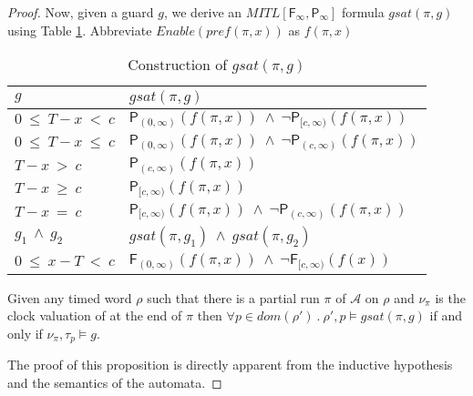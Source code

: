 \documentclass{llncs}
\newcommand{\fut}{\textsf{F}}
\newcommand{\past}{\textsf{P}}
\newcommand{\autm}{\mathcal A}
\newcommand{\mitlfpinf}{\mbox{$\mathit{MITL[\fut_\infty,\past_\infty]}$}}
\begin{document}
\begin{proof}
\medskip
Now, given a guard $g$, we derive an \mitlfpinf\/ formula $gsat(\pi,g)$ using Table \ref{tab:guard1}. Abbreviate $\mathit{Enable}(pref(\pi,x))$ as $f(\pi,x)$\\
\begin{table}
\begin{center}
\begin{tabular}{|l|l|}
\hline
 $g$  &       $gsat(\pi,g)$\\
\hline
\hline
$0~\leq~T-x~<~c$ & $\past_{(0,\infty)}(f(\pi,x)) ~ \land~ \neg \past_{[c,\infty)}(f(\pi,x))$\\  
\hline
$0~\leq~T-x~\leq~ c$ & $\past_{(0,\infty)}(f(\pi,x)) ~ \land~ \neg \past_{(c,\infty)}(f(\pi,x))$\\
\hline
$T-x ~>~c$ & $\past_{(c,\infty)}(f(\pi,x))$\\
\hline
$T-x ~\geq~c$ & $\past_{[c,\infty)}(f(\pi,x))$\\
\hline
$T-x ~=~c$ & $\past_{[c,\infty)}(f(\pi,x)) ~\land~ \neg \past_{(c,\infty)}(f(\pi,x))$\\
\hline
$g_1~\land ~g_2$ & $gsat(\pi,g_1) ~ \land ~ gsat(\pi,g_2)$\\
\hline
$0~\leq~x-T~<~c$ & $\fut_{(0,\infty)}(f(\pi,x)) ~ \land~ \neg \fut_{[c,\infty)}(f(x))$\\
\hline  
\end{tabular}
\caption{Construction of $gsat(\pi,g)$}
\label{tab:guard1}
\end{center}
\end{table}
\begin{proposition}
\label{prop:guard}
Given any timed word $\rho$ such that there is a partial run $\pi$ of $\autm$ on $\rho$ and $\nu_\pi$ is the clock valuation of at the end of $\pi$ then $\forall p\in dom(\rho') ~.~ \rho',p\models gsat(\pi,g)$ if and only if $\nu_\pi,\tau_p\models g$. 
\end{proposition}
The proof of this proposition is directly apparent from the inductive hypothesis and the semantics of the automata. 


\end{proof}
\end{document}
